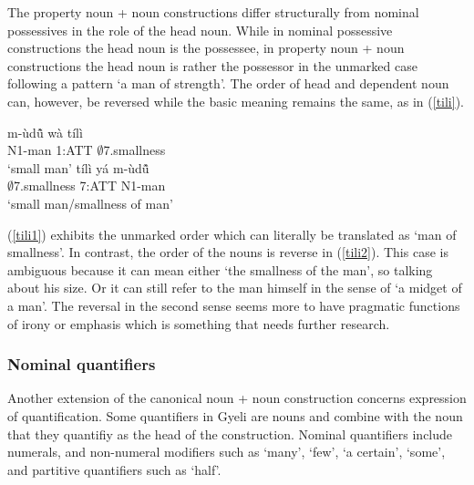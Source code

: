The property noun + noun constructions differ structurally from nominal possessives in the role of the head noun. While in nominal possessive constructions the head noun is the possessee, in property noun + noun constructions the head noun is rather the possessor in the unmarked case following a pattern `a man of strength'. The order of head and dependent noun can, however, be reversed while the basic meaning remains the same, as in (\ref{tili}). 

\begin{exe}
\ex\label{tili}
\begin{xlist}
\ex \label{tili1}
  \gll     m-ùdũ̂ wà tílì \\
               N1-man 1:ATT $\emptyset$7.smallness \\
    \trans `small man'
\ex \label{tili2}
  \gll     tílì yá m-ùdũ̂ \\
              $\emptyset$7.smallness 7:ATT N1-man  \\
    \trans `small man/smallness of man'
\end {xlist}
\end{exe}


(\ref{tili1}) exhibits the unmarked order which can literally be translated as `man of smallness'. In contrast, the order of the nouns is reverse in (\ref{tili2}). This case is ambiguous because it can mean either `the smallness of the man', so talking about his size. Or it can still refer to the man himself  in the sense of `a midget of a man'.
The reversal in the second sense seems more to have pragmatic functions of irony or emphasis which is something that needs further research. 



\subsubsection{Nominal quantifiers}  
\label{sec:NomQUANT}

Another extension of the canonical noun + noun construction concerns expression of quantification. Some quantifiers in Gyeli are nouns and combine with the noun that they quantifiy as the head of the construction.
Nominal quantifiers include numerals, and non-numeral modifiers such as `many', `few', `a certain', `some', and partitive quantifiers such as `half'.%

